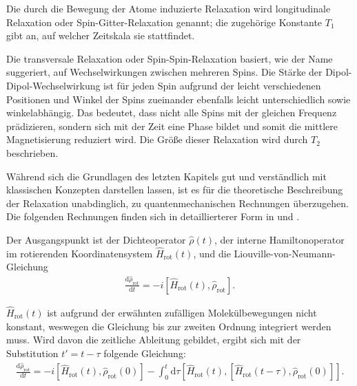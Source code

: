 Die durch die Bewegung der Atome induzierte Relaxation wird longitudinale Relaxation oder Spin-Gitter-Relaxation genannt; die zugehörige Konstante $T_1$ gibt an, auf welcher Zeitskala sie stattfindet.

Die transversale Relaxation oder Spin-Spin-Relaxation basiert, wie der Name suggeriert, auf Wechselwirkungen zwischen mehreren Spins. Die Stärke der Dipol-Dipol-Wechselwirkung ist für jeden Spin aufgrund der leicht verschiedenen Positionen und Winkel der Spins zueinander ebenfalls leicht unterschiedlich sowie winkelabhängig. Das bedeutet, dass nicht alle Spins mit der gleichen Frequenz prädizieren, sondern sich mit der Zeit eine Phase bildet und somit die mittlere Magnetisierung reduziert wird. Die Größe dieser Relaxation wird durch $T_2$ beschrieben.


Während sich die Grundlagen des letzten Kapitels gut und verständlich mit klassischen Konzepten darstellen lassen, ist es für die theoretische Beschreibung der Relaxation unabdinglich, zu quantenmechanischen Rechnungen überzugehen. Die folgenden Rechnungen finden sich in detaillierterer Form in \cite[S. 191-195]{benesi} und \cite[S. 108-110]{spiess}.

Der Ausgangspunkt ist der Dichteoperator $\hat{\rho}(t)$, der interne Hamiltonoperator im rotierenden Koordinatensystem $\hat{H}_\text{rot}(t)$, und die Liouville-von-Neumann-Gleichung
\begin{align}
    \frac{\text{d} \hat{\rho}_\text{rot}}{\text{d}t} = -i [\hat{H}_\text{rot}(t), \hat{\rho}_\text{rot}].
\end{align}

$\hat{H}_\text{rot}(t)$ ist aufgrund der erwähnten zufälligen Molekülbewegungen nicht konstant, weswegen die Gleichung bis zur zweiten Ordnung integriert werden muss. Wird davon die zeitliche Ableitung gebildet, ergibt sich mit der Substitution $t' = t - \tau$ folgende Gleichung:
\begin{align}
    \frac{\text{d} \hat{\rho}_\text{rot}}{\text{d}t} = - i [\hat{H}_\text{rot}(t), \hat{\rho}_\text{rot}(0)] - \int_0^t \text{d} \tau \left[\hat{H}_\text{rot}(t), [\hat{H}_\text{rot}(t-\tau), \hat{\rho}_\text{rot}(0)] \right].
\end{align}

